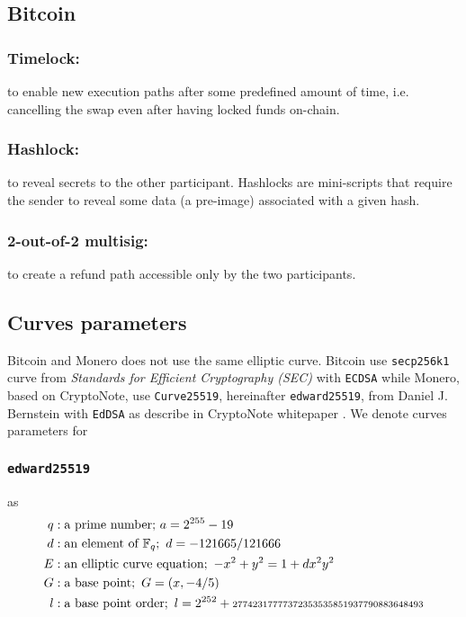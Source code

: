 \documentclass{llncs}
\begin{document}
\subsection{Bitcoin}
\subsubsection{Timelock:}
to enable new execution paths after some predefined amount of time, i.e. cancelling the swap even after having locked funds on-chain.

\subsubsection{Hashlock:}
to reveal secrets to the other participant. Hashlocks are mini-scripts that require the sender to reveal some data (a pre-image) associated with a given hash.

\subsubsection{2-out-of-2 multisig:}
to create a refund path accessible only by the two participants.


\subsection{Curves parameters}
Bitcoin and Monero does not use the same elliptic curve. Bitcoin use \texttt{secp256k1} curve from \textit{Standards for Efficient Cryptography (SEC)} with \texttt{ECDSA} while Monero, based on CryptoNote, use \texttt{Curve25519}, hereinafter \texttt{edward25519}, from Daniel J. Bernstein with \texttt{EdDSA} as describe in CryptoNote whitepaper \cite{CerRes10, van2013cryptonote}. We denote curves parameters for

\subsubsection{\texttt{edward25519}} as
\begin{equation}
\begin{split}
    q&: \text{a prime number;}\ a = 2^{255} - 19 \\
    d&: \text{an element of } \mathbb{F}_q;\ d = - 121665/121666 \\
    E&: \text{an elliptic curve equation};\ -x^2 + y^2 = 1 + dx^2y^2 \\
    G&: \text{a base point};\ G = (x, -4/5) \\
    l&: \text{a base point order};\ l = 2^{252} + \scriptsize\text{27742317777372353535851937790883648493} \\
\end{split}
\end{equation}
\end{document}
